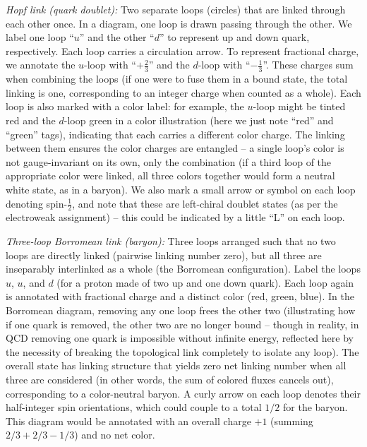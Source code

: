 \documentclass[12pt]{article}
\begin{document}
\emph{Hopf link (quark doublet):} Two separate loops (circles) that are linked through each other once. In a diagram, one loop is drawn passing through the other. We label one loop “$u$” and the other “$d$” to represent up and down quark, respectively. Each loop carries a circulation arrow. To represent fractional charge, we annotate the $u$-loop with “$+\frac{2}{3}$” and the $d$-loop with “$-\frac{1}{3}$”. These charges sum when combining the loops (if one were to fuse them in a bound state, the total linking is one, corresponding to an integer charge when counted as a whole). Each loop is also marked with a color label: for example, the $u$-loop might be tinted red and the $d$-loop green in a color illustration (here we just note “red” and “green” tags), indicating that each carries a different color charge. The linking between them ensures the color charges are entangled – a single loop’s color is not gauge-invariant on its own, only the combination (if a third loop of the appropriate color were linked, all three colors together would form a neutral white state, as in a baryon). We also mark a small arrow or symbol on each loop denoting spin-$\frac{1}{2}$, and note that these are left-chiral doublet states (as per the electroweak assignment) – this could be indicated by a little “L” on each loop.

\emph{Three-loop Borromean link (baryon):} Three loops arranged such that no two loops are directly linked (pairwise linking number zero), but all three are inseparably interlinked as a whole (the Borromean configuration). Label the loops $u$, $u$, and $d$ (for a proton made of two up and one down quark). Each loop again is annotated with fractional charge and a distinct color (red, green, blue). In the Borromean diagram, removing any one loop frees the other two (illustrating how if one quark is removed, the other two are no longer bound – though in reality, in QCD removing one quark is impossible without infinite energy, reflected here by the necessity of breaking the topological link completely to isolate any loop). The overall state has linking structure that yields zero net linking number when all three are considered (in other words, the sum of colored fluxes cancels out), corresponding to a color-neutral baryon. A curly arrow on each loop denotes their half-integer spin orientations, which could couple to a total $1/2$ for the baryon. This diagram would be annotated with an overall charge $+1$ (summing $2/3+2/3-1/3$) and no net color.
\end{document}
